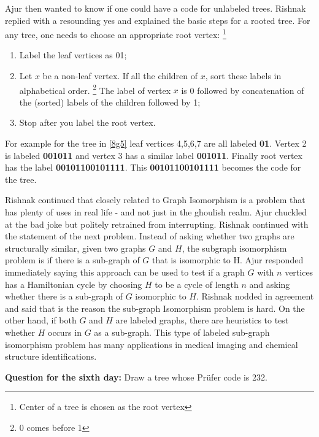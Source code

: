 Ajur then wanted to know if one could have a code for unlabeled trees. Rishnak replied with a resounding yes and explained the basic steps for a rooted tree. For any tree, one needs to choose an appropriate root vertex: \footnote{Center of a tree is chosen as the root vertex}  %
\begin{enumerate}
    \item  Label the leaf vertices as 01;
    \item Let $x$ be a non-leaf vertex. If all the children of $x$, sort these labels in alphabetical order. \footnote{0 comes before 1} The label of vertex $x$ is 0 followed by concatenation of the (sorted) labels of the children followed by 1;
    \item Stop after you label the root vertex.
\end{enumerate}

For example for the tree in \ref{8g5} leaf vertices 4,5,6,7 are all labeled \textbf{01}. Vertex 2 is labeled \textbf{001011} and vertex 3 has a similar label \textbf{001011}. Finally root vertex has the label \textbf{00101100101111}. This \textbf{00101100101111} becomes the code for the tree.

Rishnak continued that closely related to Graph Isomorphism is a problem that has plenty of uses in real life - and not just in the ghoulish realm. Ajur chuckled at the bad joke but politely retrained from interrupting. Rishnak continued with the statement of the next problem.  Instead of asking whether two graphs are structurally similar, given two graphs $G$ and $H$, the subgraph isomorphism problem is if there is a sub-graph of $G$ that is isomorphic to H. Ajur responded immediately saying this approach can be used to test if a graph $G$ with $n$ vertices has a Hamiltonian cycle by choosing $H$ to be a cycle of length $n$ and asking whether there is a sub-graph of $G$ isomorphic to $H$. Rishnak nodded in agreement and said that is the reason the sub-graph Isomorphism problem is hard. On the other hand, if both $G$ and $H$ are labeled graphs, there are heuristics to test whether $H$ occurs in $G$ as a sub-graph. This type of labeled sub-graph isomorphism problem has many applications in medical imaging and chemical structure identifications.

\textbf{Question for the sixth day:} Draw a tree whose Pr{\"u}fer code is 232.

